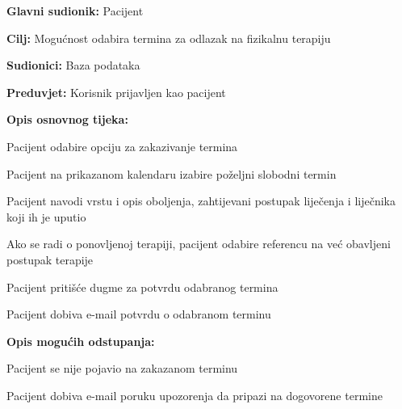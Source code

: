 \noindent {}
\begin{packed_item}
	
	\item \textbf{Glavni sudionik: }Pacijent
	\item  \textbf{Cilj:} Mogućnost odabira termina za odlazak na fizikalnu terapiju
	\item  \textbf{Sudionici:} Baza podataka
	\item  \textbf{Preduvjet:} Korisnik prijavljen kao pacijent
	\item  \textbf{Opis osnovnog tijeka:}
	
	\item[] \begin{packed_enum}
		
		\item Pacijent odabire opciju za zakazivanje termina
		\item Pacijent na prikazanom kalendaru izabire poželjni slobodni termin
		\item Pacijent navodi vrstu i opis oboljenja, zahtijevani postupak liječenja i liječnika koji ih je uputio
		\item Ako se radi o ponovljenoj terapiji, pacijent odabire referencu na već obavljeni postupak terapije
		\item Pacijent pritišće dugme za potvrdu odabranog termina
		\item Pacijent dobiva e-mail potvrdu o odabranom terminu
	\end{packed_enum}
	
	\item  \textbf{Opis mogućih odstupanja:}
	
	\item[] \begin{packed_item}
		
		\item[2.a] Pacijent se nije pojavio na zakazanom terminu
		\item[] \begin{packed_enum}
			
			\item Pacijent dobiva e-mail poruku upozorenja da pripazi na dogovorene termine
			
		\end{packed_enum}
		
		
	\end{packed_item}
\end{packed_item}

